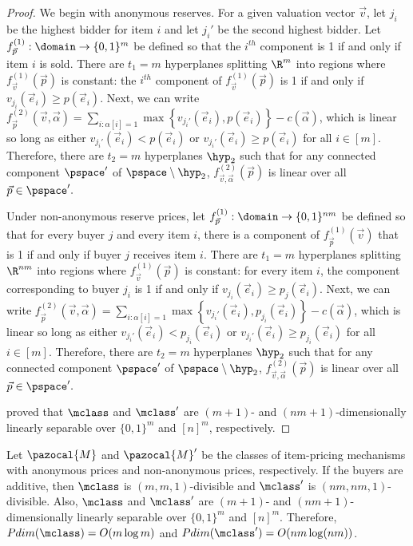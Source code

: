 \begin{proof}
We begin with anonymous reserves. For a given valuation vector $\vec{v}$, let $j_i$ be the highest bidder for item $i$ and let $j_i'$ be the second highest bidder. Let $f_{\vec{p}}^{(1)}: \domain \to \{0,1\}^m$ be defined so that the $i^{th}$ component is 1 if and only if item $i$ is sold. There are $t_1 = m$ hyperplanes splitting $\R^m$ into regions where $f_{\vec{v}}^{(1)}(\vec{p})$ is constant: the $i^{th}$ component of $f_{\vec{v}}^{(1)}(\vec{p})$ is 1 if and only if $v_{j_i}(\vec{e}_i) \geq p(\vec{e}_i)$. Next, we can write $f_{\vec{p}}^{(2)}(\vec{v}, \vec{\alpha}) = \sum_{i: \alpha[i] = 1 } \max\left\{v_{j_i'}(\vec{e}_i), p(\vec{e}_i)\right\} - c(\vec{\alpha})$, which is linear so long as either $v_{j_i'}(\vec{e}_i) <p(\vec{e}_i)$ or $v_{j_i'}(\vec{e}_i) \geq  p(\vec{e}_i)$ for all $i \in [m]$. Therefore, there are $t_2 = m$ hyperplanes $\hyp_2$ such that for any connected component $\pspace'$ of $\pspace \setminus \hyp_2$, $f_{\vec{v}, \vec{\alpha}}^{(2)}(\vec{p})$ is linear over all $\vec{p} \in \pspace'.$


Under non-anonymous reserve prices, let $f_{\vec{p}}^{(1)}: \domain \to \{0,1\}^{nm}$ be defined so that for every buyer $j$ and every item $i$, there is a component of $f_{\vec{p}}^{(1)}(\vec{v})$ that is 1 if and only if buyer $j$ receives item $i$. There are $t_1 = m$ hyperplanes splitting $\R^{nm}$ into regions where $f_{\vec{v}}^{(1)}(\vec{p})$ is constant: for every item $i$, the component corresponding to buyer $j_i$ is 1 if and only if $v_{j_i}(\vec{e}_i) \geq p_j(\vec{e}_i)$. Next, we can write $f_{\vec{p}}^{(2)}(\vec{v}, \vec{\alpha}) = \sum_{i: \alpha[i] = 1 } \max\left\{v_{j_i'}(\vec{e}_i), p_{j_i}(\vec{e}_i)\right\} - c(\vec{\alpha})$, which is linear so long as either $v_{j_i'}(\vec{e}_i) <p_{j_i}(\vec{e}_i)$ or $v_{j_i'}(\vec{e}_i) \geq  p_{j_i}(\vec{e}_i)$ for all $i \in [m]$. Therefore, there are $t_2 = m$ hyperplanes $\hyp_2$ such that for any connected component $\pspace'$ of $\pspace \setminus \hyp_2$, $f_{\vec{v}, \vec{\alpha}}^{(2)}(\vec{p})$ is linear over all $\vec{p} \in \pspace'.$

\citet{Morgenstern16:Learning} proved that $\mclass$ and $\mclass'$ are $(m+1)$- and $(nm+1)$-dimensionally linearly separable over $\{0,1\}^m$ and $[n]^m$, respectively.
\end{proof}

\begin{theorem}\label{thm:item_pricing_add_sep}
Let $\pazocal{M}$ and $\pazocal{M}'$ be the classes of item-pricing mechanisms with anonymous prices and non-anonymous prices, respectively. If the buyers are additive, then $\mclass$ is $(m, m, 1)$-divisible and $\mclass'$ is $(nm,nm,1)$-divisible. Also, $\mclass$ and $\mclass'$ are $(m+1)$- and $(nm+1)$-dimensionally linearly separable over $\{0,1\}^m$ and $[n]^m$. Therefore, $Pdim(\mclass) = O(m \log m)$ and $Pdim(\mclass') = O(nm \log (nm))$.
\end{theorem}

